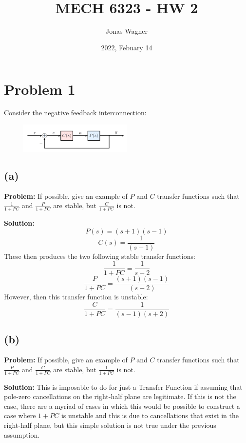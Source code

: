 \documentclass[letter]{article}
\title{MECH 6323 - HW 2}
\author{Jonas Wagner}
\date{2022, Febuary 14}
\numberwithin{equation}{section}
\begin{document}
	

\maketitle

\tableofcontents

\newpage
\section{Problem 1}
Consider the negative feedback interconnection:
\begin{figure}[ht]
	\centering
	\includegraphics[width=0.5\textwidth]{figs/pblm1.png}
\end{figure}

\subsection{(a)}
\textbf{Problem:} 
If possible, give an example of $P$ and $C$ transfer functions such that $\frac{1}{1+PC}$ and $\frac{P}{1+PC}$ are stable, but $\frac{C}{1+PC}$ is not.

\textbf{Solution:}
\[
	P(s) = (s+1) (s-1)
\]\[
	C(s) = \frac{1}{(s-1)}
\]
These then produces the two following stable transfer functions:
\[
	\frac{1}{1+PC} = \frac{1}{s+2}
\]\[
	\frac{P}{1+PC} = \frac{(s+1)(s-1)}{(s+2)}
\]
However, then this transfer function is unstable:
\[
	\frac{C}{1+PC} = \frac{1}{(s-1)(s+2)}
\]

\subsection{(b)}
\textbf{Problem:} 
If possible, give an example of $P$ and $C$ transfer functions such that $\frac{P}{1+PC}$ and $\frac{C}{1+PC}$ are stable, but $\frac{1}{1+PC}$ is not.

\textbf{Solution:}
This is imposable to do for just a Transfer Function if assuming that pole-zero cancellations on the right-half plane are legitimate.
If this is not the case, there are a myriad of cases in which this would be possible to construct a case where $1+PC$ is unstable and this is due to cancellations that exist in the right-half plane, but this simple solution is not true under the previous assumption.
\end{document}
